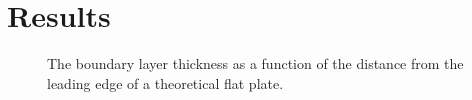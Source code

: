 \chapter{Results}
\label{cp:results}

\begin{figure}[htpb]
    \centering
    
    \caption[A graph of the boundary layer thickness vs distance from the leading edge.]{The boundary layer thickness as a function of the distance from the leading edge of a theoretical flat plate.}
    \label{fig:boundary_layer_thickness_theory}
\end{figure}